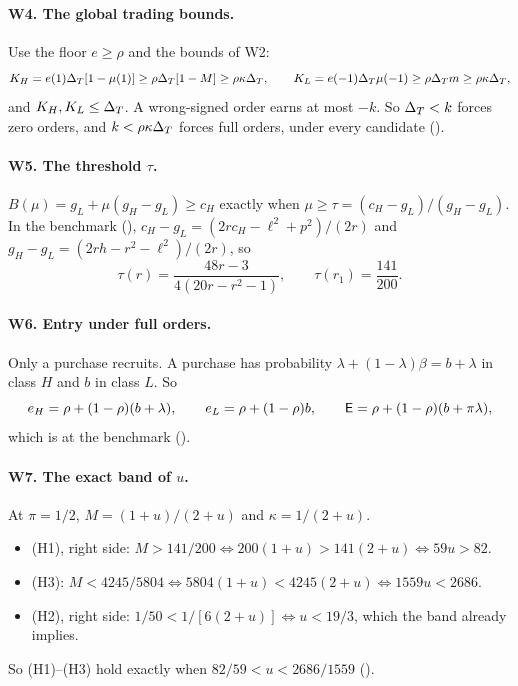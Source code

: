 \paragraph{W4. The global trading bounds.} Use the floor \(e\ge\rho\) and the bounds of W2:
\[
K_H=e(1)\Delta_T[1-\mu(1)]\ge\rho\Delta_T[1-M]\ge\rho\kappa\Delta_T,\qquad K_L=e(-1)\Delta_T\mu(-1)\ge\rho\Delta_T m\ge\rho\kappa\Delta_T,
\]
and \(K_H,K_L\le\Delta_T\). A wrong-signed order earns at most \(-k\). So \(\Delta_T<k\) forces zero orders, and
\(k<\rho\kappa\Delta_T\) forces full orders, under every candidate ().

\paragraph{W5. The threshold \texorpdfstring{\(\tau\)}{tau}.} \(B(\mu)=g_L+\mu(g_H-g_L)\ge c_H\) exactly when
\(\mu\ge\tau=(c_H-g_L)/(g_H-g_L)\). In the benchmark (),
\(c_H-g_L=(2rc_H-\ell^2+p^2)/(2r)\) and \(g_H-g_L=(2rh-r^2-\ell^2)/(2r)\), so
\[
\tau(r)=\frac{48r-3}{4(20r-r^2-1)},\qquad \tau(r_1)=\frac{141}{200}.
\]

\paragraph{W6. Entry under full orders.} Only a purchase recruits. A purchase has probability
\(\lambda+(1-\lambda)\beta=b+\lambda\) in class \(H\) and \(b\) in class \(L\). So
\[
e_H=\rho+(1-\rho)(b+\lambda),\qquad e_L=\rho+(1-\rho)b,\qquad \mathsf{E}=\rho+(1-\rho)(b+\pi\lambda),
\]
which is  at the benchmark ().

\paragraph{W7. The exact band of \texorpdfstring{\(u\)}{u}.} At \(\pi=1/2\), \(M=(1+u)/(2+u)\) and \(\kappa=1/(2+u)\).
\begin{itemize}[nosep]
\item (H1), right side: \(M>141/200\iff200(1+u)>141(2+u)\iff59u>82\).
\item (H3): \(M<4245/5804\iff5804(1+u)<4245(2+u)\iff1559u<2686\).
\item (H2), right side: \(1/50<1/[6(2+u)]\iff u<19/3\), which the band already implies.
\end{itemize}
So (H1)--(H3) hold exactly when \(82/59<u<2686/1559\) ().

